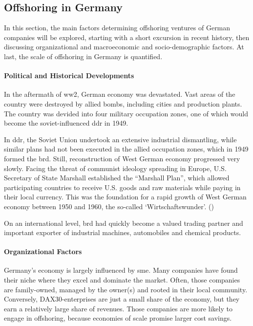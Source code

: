 \subsection{Offshoring in Germany}
\label{sec:OffshoringGER}
In this section, the main factors determining offshoring ventures of German companies will be explored, starting with a short excursion in recent history, then discussing organizational and macroeconomic and socio-demographic factors. At last, the scale of offshoring in Germany is quantified.

\paragraph{Political and Historical Developments}
In the aftermath of \gls{ww2}, German economy was devastated. Vast areas of the country were destroyed by allied bombs, including cities and production plants. The country was devided into four military occupation zones, one of which would become the soviet-influenced \gls{ddr} in 1949.

In \gls{ddr}, the Soviet Union undertook an extensive industrial dismantling, while similar plans had not been executed in the allied occupation zones, which in 1949 formed the \gls{brd}. Still, reconstruction of West German economy progressed very slowly. Facing the threat of communist ideology spreading in Europe, U.S. Secretary of State Marshall established the ``Marshall Plan'', which allowed participating countries to receive U.S. goods and raw materials while paying in their local currency. This was the foundation for a rapid growth of West German economy between 1950 and 1960, the so-called `Wirtschaftswunder'. (\cite{Kimmel.2005})

On an international level, \gls{brd} had quickly become a valued trading partner and important exporter of industrial machines, automobiles and chemical products. %


\paragraph{Organizational Factors}
Germany's economy is largely influenced by \gls{sme}. Many companies have found their niche where they excel and dominate the market. Often, those companies are family-owned, managed by the owner(s) and rooted in their local community. %
Conversely, DAX30-enterprises are just a small share of the economy, but they earn a relatively large share of revenues. Those companies are more likely to engage in offshoring, because economies of scale promise larger cost savings.

